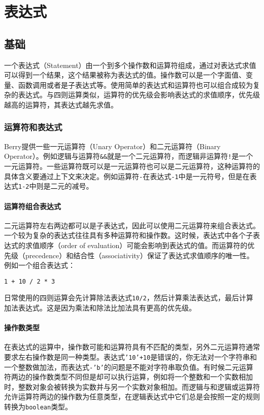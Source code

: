 \chapter{表达式}

\section{基础}

一个表达式（Statement）由一个到多个操作数和运算符组成，通过对表达式求值可以得到一个结果，这个结果被称为表达式的值。操作数可以是一个字面值、变量、函数调用或者是子表达式等。使用简单的表达式和运算符也可以组合成较为复杂的表达式。与四则运算类似，运算符的优先级会影响表达式的求值顺序，优先级越高的运算符，其表达式越先求值。

\subsection{运算符和表达式}

Berry提供一些一元运算符（Unary Operator）和二元运算符（Binary Operator）。例如逻辑与运算符\texttt{\&\&}就是一个二元运算符，而逻辑非运算符\texttt{!}是一个一元运算符。一些运算符既可以是一元运算符也可以是二元运算符，这种运算符的具体含义要通过上下文来决定。例如运算符\texttt{-}在表达式\texttt{-1}中是一元符号，但是在表达式\texttt{1-2}中则是二元的减号。

\subsubsection{运算符组合表达式}

二元运算符左右两边都可以是子表达式，因此可以使用二元运算符来组合表达式。一个较为复杂的表达式往往具有多种运算符和操作数。这时候，表达式中各个子表达式的求值顺序（order of evaluation）可能会影响到表达式的值。而运算符的优先级（precedence）和结合性（associativity）保证了表达式求值顺序的唯一性。例如一个组合表达式：
\begin{lstlisting}[language=berry, numbers=none]
1 + 10 / 2 * 3
\end{lstlisting}
日常使用的四则运算会先计算除法表达式\texttt{10/2}，然后计算乘法表达式，最后计算加法表达式。这是因为乘法和除法比加法具有更高的优先级。

\subsubsection{操作数类型}

在表达式的运算中，操作数可能和运算符具有不匹配的类型，另外二元运算符通常要求左右操作数是同一种类型。表达式\texttt{'10'+10}是错误的，你无法对一个字符串和一个整数做加法，而表达式\texttt{-'b'}的问题是不能对字符串取负值。有时候二元运算符两边的操作数类型不同但是却可以执行运算，例如将一个整数和一个实数相加时，整数对象会被转换为实数并与另一个实数对象相加。而逻辑与和逻辑或运算符允许运算符两边的操作数为任意类型，在逻辑表达式中它们总是会按照一定的规则转换为\texttt{boolean}类型。

